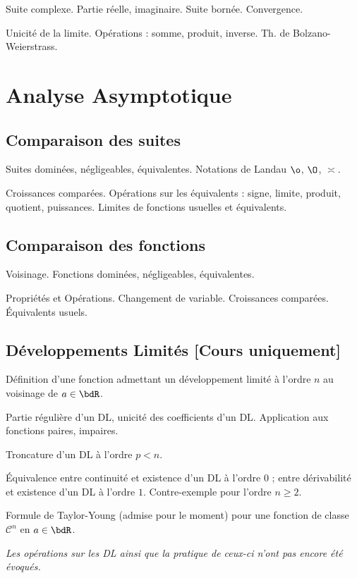 \documentclass[a4paper,french,bookmarks]{article}
\begin{document}
Suite complexe. Partie réelle, imaginaire. Suite bornée. Convergence.

Unicité de la limite. Opérations : somme, produit, inverse. Th. de Bolzano-Weierstrass.

\section*{Analyse Asymptotique}

\subsection*{Comparaison des suites}

Suites dominées, négligeables, équivalentes. Notations de Landau $\o$, $\O$, $\asymp$.

Croissances comparées. Opérations sur les équivalents : signe, limite, produit, quotient, puissances. Limites de fonctions usuelles et équivalents.

\subsection*{Comparaison des fonctions}

Voisinage. Fonctions dominées, négligeables, équivalentes.

Propriétés et Opérations. Changement de variable. Croissances comparées. Équivalents usuels.

\subsection*{Développements Limités [Cours uniquement]}

\begin{enumerate}
    \itb Définition d’une fonction admettant un développement limité à l’ordre $n$ au voisinage de $a \in \bdR$.
    
    \itb Partie régulière d’un DL, unicité des coefficients d’un DL. Application aux fonctions paires, impaires.
    
    \itb Troncature d’un DL à l’ordre $p < n$.
    
    \itb Équivalence entre continuité et existence d’un DL à l’ordre $0$ ; entre dérivabilité et existence d’un DL à l’ordre $1$. Contre-exemple pour l’ordre $n \geq 2$.
    
    \itb Formule de Taylor-Young (admise pour le moment) pour une fonction de classe $\mathcal{C}^n$ en $a \in \bdR$.
\end{enumerate}
\begin{center}
\end{center}
\textit{Les opérations sur les DL ainsi que la pratique de ceux-ci n'ont pas encore été évoqués.}
\end{document}

